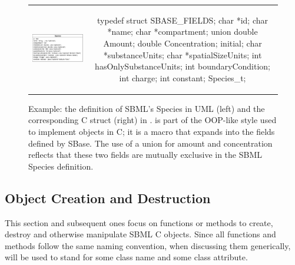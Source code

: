 \documentclass{sbmlmanual}
\begin{document}
\begin{figure}[bht]
  \begin{tabular}{m{8.5cm}c}
    \includegraphics[scale=0.67]{graphics/species}
    &
    \begin{example}[c]
typedef struct
{
  SBASE_FIELDS;
  char   *id;
  char   *name;
  char   *compartment;
  union
  {
    double Amount;
    double Concentration;
  } initial;
  char   *substanceUnits;
  char   *spatialSizeUnits;
  int     hasOnlySubstanceUnits;
  int     boundaryCondition;
  int     charge;
  int     constant;
} Species_t;
    \end{example}\\
  \end{tabular}
  \caption{Example: the definition of SBML's Species in UML (left) and the
    corresponding  C struct (right) in \libsbml{}.
     is part of the OOP-like style used to implement
    objects in C; it is a macro that expands into the fields defined by
    SBase.  The use of a union for amount and concentration reflects that
    these two fields are mutually exclusive in the SBML Species
    definition.}
  \label{fig:species-uml-and-c}
\end{figure}



\subsection{Object Creation and Destruction}

This section and subsequent ones focus on functions or methods to
create, destroy and otherwise manipulate SBML C objects.  Since all
functions and methods follow the same naming convention, when
discussing them generically,  will be used to stand for
some class name and  some class attribute.
\end{document}
